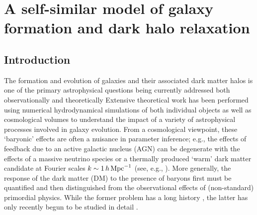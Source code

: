 \chapter{A self-similar model of galaxy formation and dark halo relaxation}
\label{chap:self-sim-relxn}

\section{Introduction}
\label{sec:intro-ch:ssr}


\noindent
The formation and evolution of galaxies and their associated dark matter halos is one of the primary astrophysical questions being currently addressed both observationally \cite{2020SDSS_Ahumadaetal_16th_data,2017Willetetal_GalxayZoo_HST,2023Harikane_etal_JWST}
and theoretically \cite{2015SomervilleDave,2018WechslerTinker}
Extensive theoretical work has been performed using numerical hydrodynamical simulations of both individual objects \cite{2006Dekel&Birnboim,2014Hopkins_FIRE,2015LauNagaietal,2023FIRE-2_publicrelease} as well as cosmological volumes \cite{2010Schaye_OWLS,2014Genel_Illustris,2015Schaye_EAGLE,2017Kaviraj_HorizonAGN,2018TNG_Pillepich_etal,2019Dave_SIMBA,2021camels_presentation} 
to understand the impact of a variety of astrophysical processes involved in galaxy evolution. From a cosmological viewpoint, these `baryonic' effects are often a nuisance in parameter inference; e.g., the effects of feedback due to an active galactic nucleus (AGN) can be degenerate with the effects of a massive neutrino species or a thermally produced `warm' dark matter candidate at Fourier scales $k\sim1\,h\,{\rm Mpc}^{-1}$ (see, e.g., \cite{2019Chisari_etal_Baryfeedback,2020AricoAnguloetal_baryonifi}).
More generally, the response of the dark matter (DM) to the presence of baryons first must be quantified and then distinguished from the observational effects of (non-standard) primordial physics. While the former problem has a long history \cite{1986Blumenthal,2004Gnesin_etal,2005SellwoodMcGaugh,2006Gustafsson_FS,2010Abadi_NFBS,2010DuffySchaye_etal,2010PedrosaTissera_etal,2010TisseraWhite_etal,2019ArtalePedrosa_etal,2022ForouharMoreno_etal,2023Velmani&Paranjape},
the latter has only recently begun to be studied in detail \cite{2011TeyssierMMDM,2015SchneiderTeyssier,2015Mead_PHJH,2020AricoAnguloetal_baryonifi,2021AricoAnguloetal_baryonifi,2023EuclidCastro_etal}.

